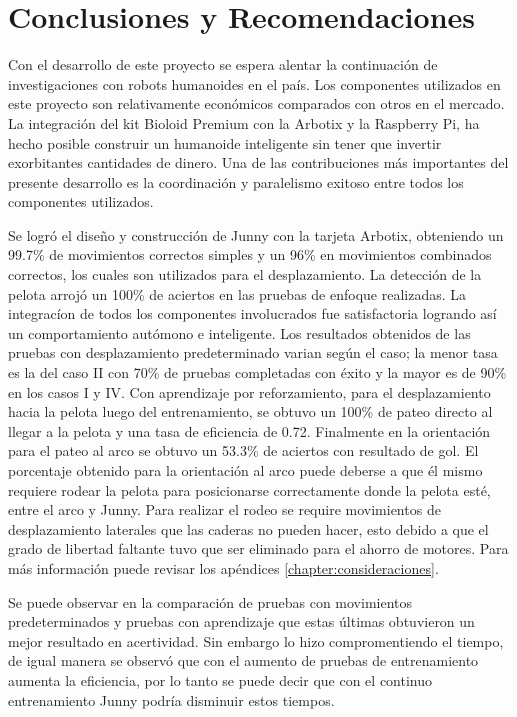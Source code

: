 \chapter{Conclusiones y Recomendaciones} \label{chapter:conclusiones}

\label{chap:conclusiones}

Con el desarrollo de este proyecto se espera alentar la continuación de investigaciones con robots humanoides en el pa\'is. Los componentes utilizados en este proyecto son relativamente económicos comparados con otros en el mercado. La integración del kit Bioloid Premium con la Arbotix y la Raspberry Pi, ha hecho posible construir un humanoide inteligente sin tener que invertir exorbitantes cantidades de dinero. Una de las contribuciones más importantes del presente desarrollo es la coordinación y paralelismo exitoso entre todos los componentes utilizados.

Se logr\'o el dise\~no y construcci\'on de Junny con la tarjeta Arbotix, obteniendo un 99.7\% de movimientos correctos simples y un 96\% en movimientos combinados correctos, los cuales son utilizados para el desplazamiento. La detecci\'on de la pelota arroj\'o un 100\% de aciertos en las pruebas de enfoque realizadas. La integrac\'ion de todos los componentes involucrados fue satisfactoria logrando as\'i un comportamiento aut\'omono e inteligente. Los resultados obtenidos de las pruebas con desplazamiento predeterminado varian seg\'un el caso; la menor tasa es la del caso II con 70\% de pruebas completadas con éxito y la mayor es de 90\% en los casos I y IV. Con aprendizaje por reforzamiento, para el desplazamiento hacia la pelota luego del entrenamiento, se obtuvo un 100\% de pateo directo al llegar a la pelota y una tasa de eficiencia de 0.72. Finalmente en la orientaci\'on para el pateo al arco se obtuvo un 53.3\% de aciertos con resultado de gol. 
El porcentaje obtenido para la orientaci\'on al arco puede deberse a que \'el mismo requiere rodear la pelota para posicionarse correctamente donde la pelota est\'e, entre el arco y Junny. Para realizar el rodeo se require movimientos de desplazamiento laterales que las caderas no pueden hacer, esto debido a que el grado de libertad faltante tuvo que ser eliminado para el ahorro de motores. Para m\'as informaci\'on puede revisar los ap\'endices \ref{chapter:consideraciones}. 

Se puede observar en la comparaci\'on de pruebas con movimientos predeterminados y pruebas con aprendizaje que estas \'ultimas obtuvieron un mejor resultado en acertividad. Sin embargo  lo hizo compromentiendo el tiempo, de igual manera se observ\'o que con el aumento de pruebas de entrenamiento aumenta la eficiencia, por lo tanto se puede decir que con el continuo entrenamiento Junny podr\'ia disminuir estos tiempos. 

